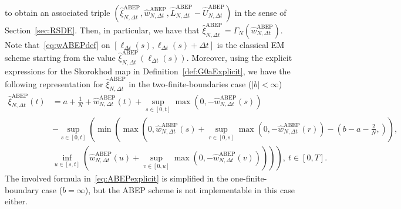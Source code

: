 \documentclass[11pt]{amsart}
\newcommand{\ABEP}{\textrm{ABEP}}
\begin{document}
{\begin{equation}
\end{equation}
to obtain an associated triple $(\hat{\xi}^{\ABEP}_{N,\Delta t},\hat{w}_{N,\Delta t}^{\ABEP},\hat{L}_{N,\Delta t}^{\ABEP}-\hat{U}_{N,\Delta t}^{\ABEP})$ in the sense of Section~\ref{sec:RSDE}. Then, in particular, we have that $\hat{\xi}^{\ABEP}_{N,\Delta t} = \Gamma_{N}(\hat{w}_{N,\Delta t}^{\ABEP})$. Note that~\eqref{eq:wABEPdef} on $[\ell_{\Delta t}(s),\ell_{\Delta t}(s)+\Delta t]$ is the classical EM scheme starting from the value $\hat{\xi}^{\ABEP}_{N,\Delta t}(\ell_{\Delta t}(s))$. Moreover, using the explicit expressions for the Skorokhod map in Definition~\ref{def:G0aExplicit}, we have the following representation for $\hat{\xi}^{\ABEP}_{N,\Delta t}$ in the two-finite-boundaries case ($|b|<\infty$)
\begin{equation}\label{eq:ABEPexplicit}
  \begin{split}
    \hat{\xi}^{\ABEP}_{N,\Delta t}(t) &= a + \frac{1}{N} + \hat{w}_{N,\Delta t}^{\ABEP}(t) + \sup_{s \in [0,t]} \max(0,-\hat{w}_{N,\Delta t}^{\ABEP}(s)) \\ &- \sup_{s \in [0,t]} \left( \min \left( \max \left(0, \hat{w}_{N,\Delta t}^{\ABEP}(s) + \sup_{r \in [0,s]} \max \left( 0,-\hat{w}_{N,\Delta t}^{\ABEP}(r) \right) - \left( b - a - \frac{2}{N},\right) \right), \right. \right. \\ &\left. \left. \inf_{u \in [s,t]} \left( \hat{w}_{N,\Delta t}^{\ABEP}(u) + \sup_{v \in [0,u]} \max \left( 0 , -\hat{w}_{N,\Delta t}^{\ABEP}(v) \right) \right) \right) \right),\ t \in [0,T].
  \end{split}
\end{equation}
The involved formula in~\eqref{eq:ABEPexplicit} is simplified in the one-finite-boundary case ($b=\infty$), but the ABEP scheme is not implementable in this case either.

}
\end{document}
